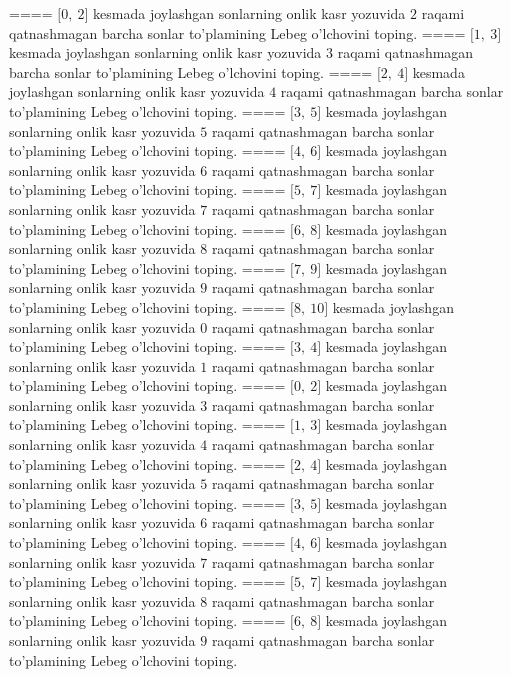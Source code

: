 ====
\(\lbrack 0,\ 2\rbrack\) kesmada joylashgan sonlarning onlik kasr yozuvida \(2\) raqami qatnashmagan barcha sonlar to'plamining Lebeg o'lchovini toping.
====
\(\lbrack 1,\ 3\rbrack\) kesmada joylashgan sonlarning onlik kasr yozuvida \(3\) raqami qatnashmagan barcha sonlar to'plamining Lebeg o'lchovini toping.
====
\(\lbrack 2,\ 4\rbrack\) kesmada joylashgan sonlarning onlik kasr yozuvida \(4\) raqami qatnashmagan barcha sonlar to'plamining Lebeg o'lchovini toping.
====
\(\lbrack 3,\ 5\rbrack\) kesmada joylashgan sonlarning onlik kasr yozuvida \(5\) raqami qatnashmagan barcha sonlar to'plamining Lebeg o'lchovini toping.
====
\(\lbrack 4,\ 6\rbrack\) kesmada joylashgan sonlarning onlik kasr yozuvida \(6\) raqami qatnashmagan barcha sonlar to'plamining Lebeg o'lchovini toping.
====
\(\lbrack 5,\ 7\rbrack\) kesmada joylashgan sonlarning onlik kasr yozuvida \(7\) raqami qatnashmagan barcha sonlar to'plamining Lebeg o'lchovini toping.
====
\(\lbrack 6,\ 8\rbrack\) kesmada joylashgan sonlarning onlik kasr yozuvida \(8\) raqami qatnashmagan barcha sonlar to'plamining Lebeg o'lchovini toping.
====
\(\lbrack 7,\ 9\rbrack\) kesmada joylashgan sonlarning onlik kasr yozuvida \(9\) raqami qatnashmagan barcha sonlar to'plamining Lebeg o'lchovini toping.
====
\(\lbrack 8,\ 10\rbrack\) kesmada joylashgan sonlarning onlik kasr yozuvida \(0\) raqami qatnashmagan barcha sonlar to'plamining Lebeg o'lchovini toping.
====
\(\lbrack 3,\ 4\rbrack\) kesmada joylashgan sonlarning onlik kasr yozuvida \(1\) raqami qatnashmagan barcha sonlar to'plamining Lebeg o'lchovini toping.
====
\(\lbrack 0,\ 2\rbrack\) kesmada joylashgan sonlarning onlik kasr yozuvida \(3\) raqami qatnashmagan barcha sonlar to'plamining Lebeg o'lchovini toping.
====
\(\lbrack 1,\ 3\rbrack\) kesmada joylashgan sonlarning onlik kasr yozuvida \(4\) raqami qatnashmagan barcha sonlar to'plamining Lebeg o'lchovini toping.
====
\(\lbrack 2,\ 4\rbrack\) kesmada joylashgan sonlarning onlik kasr yozuvida \(5\) raqami qatnashmagan barcha sonlar to'plamining Lebeg o'lchovini toping.
====
\(\lbrack 3,\ 5\rbrack\) kesmada joylashgan sonlarning onlik kasr yozuvida \(6\) raqami qatnashmagan barcha sonlar to'plamining Lebeg o'lchovini toping.
====
\(\lbrack 4,\ 6\rbrack\) kesmada joylashgan sonlarning onlik kasr yozuvida \(7\) raqami qatnashmagan barcha sonlar to'plamining Lebeg o'lchovini toping.
====
\(\lbrack 5,\ 7\rbrack\) kesmada joylashgan sonlarning onlik kasr yozuvida \(8\) raqami qatnashmagan barcha sonlar to'plamining Lebeg o'lchovini toping.
====
\(\lbrack 6,\ 8\rbrack\) kesmada joylashgan sonlarning onlik kasr yozuvida \(9\) raqami qatnashmagan barcha sonlar to'plamining Lebeg o'lchovini toping.
